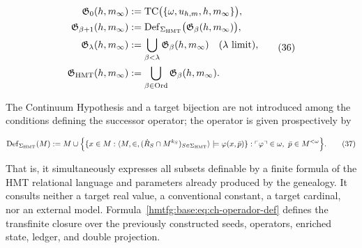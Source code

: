 \[
 \begin{aligned}
  \mathfrak G_0(h,m_\infty)
  &:=\operatorname{TC}\bigl(\{\omega,u_{h,m},h,m_\infty\}\bigr),\\
  \mathfrak G_{\beta+1}(h,m_\infty)
  &:=\operatorname{Def}_{\Sigma_{\rm HMT}}
       \bigl(\mathfrak G_\beta(h,m_\infty)\bigr),\\
  \mathfrak G_\lambda(h,m_\infty)
  &:=\bigcup_{\beta<\lambda}\mathfrak G_\beta(h,m_\infty)
       \quad(\lambda\text{ limit}),\\
  \mathfrak G_{\rm HMT}(h,m_\infty)
  &:=\bigcup_{\beta\in\operatorname{Ord}}
       \mathfrak G_\beta(h,m_\infty).
 \end{aligned}
\tag{36}\label{hmtfg:base:eq:ch-clausura-transfinita}
\]

The Continuum Hypothesis and a target bijection are not introduced among the
conditions defining the successor operator; the operator is given
prospectively by

\[
 \operatorname{Def}_{\Sigma_{\rm HMT}}(M)
 :=M\cup
 \Bigl\{
   \{x\in M:\langle M,\in,
       (\dot R_S\cap M^{k_S})_{S\in\Sigma_{\rm HMT}}\rangle
       \models\varphi(x,\bar p)\}:
   \ulcorner\varphi\urcorner\in\omega,
   \ \bar p\in M^{<\omega}
 \Bigr\}.
\tag{37}\label{hmtfg:base:eq:ch-operador-def}
\]

That is, it simultaneously expresses all subsets definable by a finite formula
of the HMT relational language and parameters already produced by the
genealogy. It consults neither a target real value, a conventional constant, a
target cardinal, nor an external model. Formula~\eqref{hmtfg:base:eq:ch-operador-def}
defines the transfinite closure over the previously constructed seeds,
operators, enriched state, ledger, and double projection.

